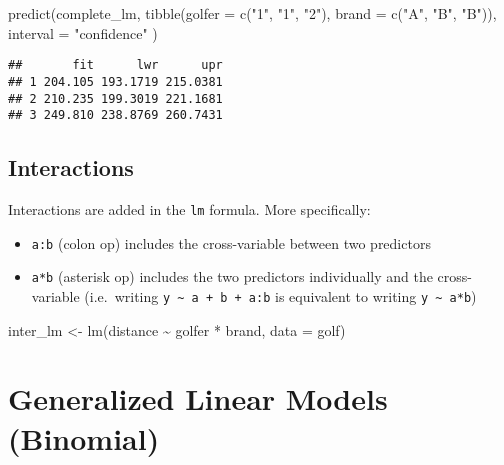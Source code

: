 \documentclass[
  oneside]{book}
\newenvironment{Shaded}{\begin{snugshade}}{\end{snugshade}}
\newcommand{\AttributeTok}[1]{\textcolor[rgb]{0.77,0.63,0.00}{#1}}
\newcommand{\FunctionTok}[1]{\textcolor[rgb]{0.00,0.00,0.00}{#1}}
\newcommand{\NormalTok}[1]{#1}
\newcommand{\OtherTok}[1]{\textcolor[rgb]{0.56,0.35,0.01}{#1}}
\newcommand{\SpecialCharTok}[1]{\textcolor[rgb]{0.00,0.00,0.00}{#1}}
\newcommand{\StringTok}[1]{\textcolor[rgb]{0.31,0.60,0.02}{#1}}
\providecommand{\tightlist}{%
  \setlength{\itemsep}{0pt}\setlength{\parskip}{0pt}}
\begin{document}
\begin{Shaded}
\begin{Highlighting}[]
\FunctionTok{predict}\NormalTok{(complete\_lm, }\FunctionTok{tibble}\NormalTok{(}\AttributeTok{golfer =} \FunctionTok{c}\NormalTok{(}\StringTok{"1"}\NormalTok{, }\StringTok{"1"}\NormalTok{, }\StringTok{"2"}\NormalTok{), }\AttributeTok{brand =} \FunctionTok{c}\NormalTok{(}\StringTok{"A"}\NormalTok{, }\StringTok{"B"}\NormalTok{, }\StringTok{"B"}\NormalTok{)),}
  \AttributeTok{interval =} \StringTok{"confidence"}
\NormalTok{)}
\end{Highlighting}
\end{Shaded}

\begin{verbatim}
##       fit      lwr      upr
## 1 204.105 193.1719 215.0381
## 2 210.235 199.3019 221.1681
## 3 249.810 238.8769 260.7431
\end{verbatim}

\hypertarget{interactions}{%
\section{Interactions}\label{interactions}}

Interactions are added in the \texttt{lm} formula. More specifically:

\begin{itemize}
\tightlist
\item
  \texttt{a:b} (colon op) includes the cross-variable between two predictors
\item
  \texttt{a*b} (asterisk op) includes the two predictors individually and the
  cross-variable (i.e.~writing \texttt{y\ \textasciitilde{}\ a\ +\ b\ +\ a:b} is equivalent to
  writing \texttt{y\ \textasciitilde{}\ a*b})
\end{itemize}

\begin{Shaded}
\begin{Highlighting}[]
\NormalTok{inter\_lm }\OtherTok{\textless{}{-}} \FunctionTok{lm}\NormalTok{(distance }\SpecialCharTok{\textasciitilde{}}\NormalTok{ golfer }\SpecialCharTok{*}\NormalTok{ brand, }\AttributeTok{data =}\NormalTok{ golf)}
\end{Highlighting}
\end{Shaded}

\hypertarget{generalized-linear-models-binomial}{%
\chapter{Generalized Linear Models (Binomial)}\label{generalized-linear-models-binomial}}
\end{document}
